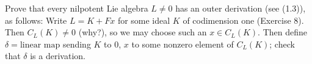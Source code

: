 Prove that every nilpotent Lie algebra $L \neq 0$ has an outer derivation (see (1.3)), as follows: Write $L = K + Fx$ for some ideal $K$ of codimension one (Exercise 8). Then $C_L(K) \neq 0$ (why?), so we may choose such an $x \in C_L(K)$. Then define $\delta = \text{linear map}$ sending $K$ to $0$, $x$ to some nonzero element of $C_L(K)$; check that $\delta$ is a derivation.
